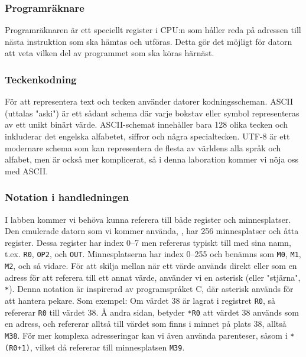 \subsubsection{Programräknare}
Programräknaren är ett speciellt register i CPU:n som håller reda på adressen till nästa instruktion som ska hämtas och utföras. Detta gör det möjligt för datorn att veta vilken del av programmet som ska köras härnäst.

\subsubsection{Teckenkodning}
För att representera text och tecken använder datorer kodningsscheman. ASCII (uttalas "aski") är ett sådant schema där varje bokstav eller symbol representeras av ett unikt binärt värde. ASCII-schemat innehåller bara 128 olika tecken och inkluderar det engelska alfabetet, siffror och några specialtecken. UTF-8 är ett modernare schema som kan representera de flesta av världens alla språk och alfabet, men är också mer komplicerat, så i denna laboration kommer vi nöja oss med ASCII.

\subsubsection{Notation i handledningen}
I labben kommer vi behöva kunna referera till både register och minnesplatser. Den emulerade datorn som vi kommer använda, \progname{}, har 256 minnesplatser och åtta register. Dessa register har index 0--7 men refereras typiskt till med sina namn, t.ex. \texttt{R0}, \texttt{OP2}, och \texttt{OUT}. Minnesplatserna har index 0--255 och benämns som \texttt{M0}, \texttt{M1}, \texttt{M2}, och så vidare. För att skilja mellan när ett värde används direkt eller som en adress för att referera till ett annat värde, använder vi en asterisk (eller "stjärna", \texttt{*}). Denna notation är inspirerad av programspråket C, där asterisk används för att hantera pekare. Som exempel: Om värdet 38 är lagrat i registret \texttt{R0}, så refererar \texttt{R0} till värdet 38. Å andra sidan, betyder \texttt{*R0} att värdet 38 används som en adress, och refererar alltså till värdet som finns i minnet på plats 38, alltså \texttt{M38}. För mer komplexa adresseringar kan vi även använda parenteser, såsom i \texttt{*(R0+1)}, vilket då refererar till minnesplatsen \texttt{M39}.



